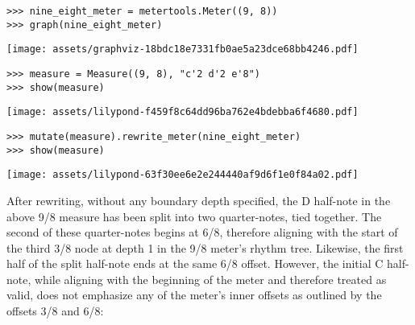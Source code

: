 \begin{abjadbookoutput}
\begin{singlespacing}
\vspace{-0.5\baselineskip}
\begin{lstlisting}
>>> nine_eight_meter = metertools.Meter((9, 8))
>>> graph(nine_eight_meter)
\end{lstlisting}
\noindent\texttt{[image: assets/graphviz-18bdc18e7331fb0ae5a23dce68bb4246.pdf]}
\end{singlespacing}
\end{abjadbookoutput}

\begin{comment}
<abjad>
measure = Measure((9, 8), "c'2 d'2 e'8")
show(measure)
</abjad>
\end{comment}

\begin{abjadbookoutput}
\begin{singlespacing}
\vspace{-0.5\baselineskip}
\begin{lstlisting}
>>> measure = Measure((9, 8), "c'2 d'2 e'8")
>>> show(measure)
\end{lstlisting}
\noindent\texttt{[image: assets/lilypond-f459f8c64dd96ba762e4bdebba6f4680.pdf]}
\end{singlespacing}
\end{abjadbookoutput}

\begin{comment}
<abjad>
mutate(measure).rewrite_meter(nine_eight_meter)
show(measure)
</abjad>
\end{comment}

\begin{abjadbookoutput}
\begin{singlespacing}
\vspace{-0.5\baselineskip}
\begin{lstlisting}
>>> mutate(measure).rewrite_meter(nine_eight_meter)
>>> show(measure)
\end{lstlisting}
\noindent\texttt{[image: assets/lilypond-63f30ee6e2e244440af9d6f1e0f84a02.pdf]}
\end{singlespacing}
\end{abjadbookoutput}

\noindent After rewriting, without any boundary depth specified, the D
half-note in the above 9/8 measure has been split into two quarter-notes, tied
together. The second of these quarter-notes begins at 6/8, therefore aligning
with the start of the third 3/8 node at depth 1 in the 9/8 meter's rhythm tree.
Likewise, the first half of the split half-note ends at the same 6/8 offset.
However, the initial C half-note, while aligning with the beginning of the
meter and therefore treated as valid, does not emphasize any of the meter's
inner offsets as outlined by the offsets 3/8 and 6/8:

